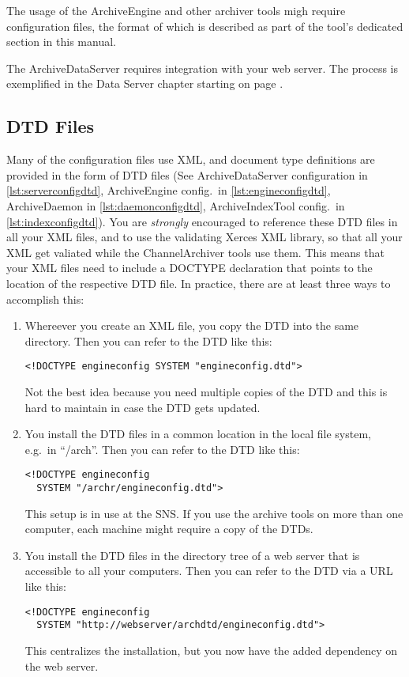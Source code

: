 The usage of the ArchiveEngine and other archiver tools migh require
configuration files, the format of which is described as part of the
tool's dedicated section in this manual.

The ArchiveDataServer requires integration with your web server. The
process is exemplified in the Data Server chapter starting on page
\pageref{sec:dataserver}.

\subsection{DTD Files} \label{sec:dtdfiles}
Many of the configuration files use XML, and document type
definitions are provided in the form of DTD files
(See ArchiveDataServer configuration in \ref{lst:serverconfigdtd},
 ArchiveEngine config.\ in \ref{lst:engineconfigdtd}, ArchiveDaemon in
 \ref{lst:daemonconfigdtd}, ArchiveIndexTool config.\ in
 \ref{lst:indexconfigdtd}).
You are \emph{strongly} encouraged to reference these DTD files in all
your XML files, and to use the validating Xerces XML library, so that
all your XML get valiated while the ChannelArchiver tools use them.
This means that your XML files need to include a DOCTYPE declaration
that points to the location of the respective DTD file.
In practice, there are at least three ways to accomplish this:
\begin{enumerate}
\item Whereever you create an XML file, you copy the DTD into the same
  directory. Then you can refer to the DTD like this: 
  \begin{lstlisting}[keywordstyle=\sffamily]
  <!DOCTYPE engineconfig SYSTEM "engineconfig.dtd">
  \end{lstlisting}
  \noindent Not the best idea because you need multiple copies of the
  DTD and this is hard to maintain in case the DTD gets updated.
\item You install the DTD files in a common location in the local file
  system, e.g.\ in ``/arch''. Then you can refer to the DTD like this: 
  \begin{lstlisting}[keywordstyle=\sffamily]
  <!DOCTYPE engineconfig
  SYSTEM "/archr/engineconfig.dtd">
  \end{lstlisting}
  \noindent This setup is in use at the SNS. If you use the archive tools
  on more than one computer, each machine might require a copy of the DTDs.
\item You install the DTD files in the directory tree of a web server
  that is accessible to all your computers.
  Then you can refer to the DTD via a URL like this: 
  \begin{lstlisting}[keywordstyle=\sffamily]
  <!DOCTYPE engineconfig
  SYSTEM "http://webserver/archdtd/engineconfig.dtd">
  \end{lstlisting}
  This centralizes the installation, but you now have the added dependency on
  the web server.
\end{enumerate}
